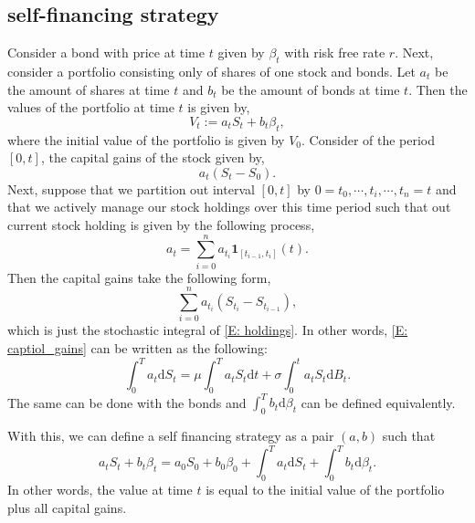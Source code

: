 \documentclass{article}
\numberwithin{equation}{section}
\newcommand{\ud}{\ensuremath{\mathrm{d}}}
\begin{document}
\subsection{self-financing strategy}
Consider a bond with price at time $t$ given by $\beta_t$ with risk free rate $r$. Next, consider a portfolio consisting only of shares of one stock and bonds. Let $a_t$ be the amount of shares at time $t$ and $b_t$ be the amount of bonds at time $t$. Then the values of the portfolio at time $t$ is given by,
	\[
		V_t := a_t S_t + b_t \beta_t,
	\] 
where the initial value of the portfolio is given by $V_0$. Consider of the period $[0,t]$, the capital gains of the stock given by,
	\[
		a_t(S_t - S_0).
	\]
Next, suppose that we partition out interval $[0,t]$ by $0 = t_0, \cdots, t_i, \cdots, t_{n} = t$ and that we actively manage our stock holdings over this time period such that out current stock holding is given by the following process,
	\begin{equation} \label{E: holdings}
		a_t = \sum_{i=0}^n a_{t_i} \textbf{1}_{[t_{i-1}, t_i]}(t).
	\end{equation}
Then the capital gains take the following form,
	\begin{equation} \label{E: captiol_gains}
		\sum_{i=0}^n a_{t_i}(S_{t_i} - S_{t_{i-1}}),
	\end{equation}
which is just the stochastic integral of \eqref{E: holdings}. In other words, \eqref{E: captiol_gains} can be written as the following:
	\begin{equation}
		\int_0^T a_t \ud S_t = \mu \int_0^T a_t S_t\ud t + \sigma \int_0^t a_t S_t \ud B_t.
	\end{equation}
The same can be done with the bonds and $\int_0^T b_t \ud \beta_t$ can be defined equivalently.

With this, we can define a self financing strategy as a pair $(a, b)$ such that 
	\begin{equation}
		a_t S_t + b_t \beta_t = a_0 S_0 + b_0 \beta_0 + \int_0^T a_t \ud S_t + \int_0^T b_t \ud \beta_t.
	\end{equation}
In other words, the value at time $t$ is equal to the initial value of the portfolio plus all capital gains.
\end{document}
